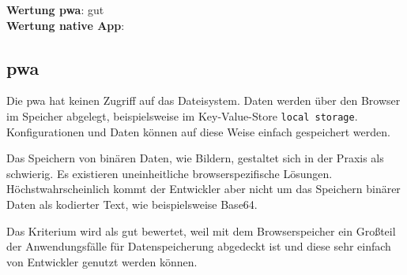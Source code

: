 \textbf{Wertung \ac{pwa}}: gut\\
\textbf{Wertung native App}:  \\

\subsection{\ac{pwa}}
Die \ac{pwa} hat keinen Zugriff auf das Dateisystem. Daten werden über den Browser im Speicher abgelegt, beispielsweise im Key-Value-Store \texttt{local storage}. Konfigurationen und Daten können auf diese Weise einfach gespeichert werden.

Das Speichern von binären Daten, wie Bildern, gestaltet sich in der Praxis als schwierig. Es existieren uneinheitliche browserspezifische Lösungen. Höchstwahrscheinlich kommt der Entwickler aber nicht um das Speichern binärer Daten als kodierter Text, wie beispielsweise Base64.

Das Kriterium wird als gut bewertet, weil mit dem Browserspeicher ein Großteil der Anwendungsfälle für Datenspeicherung abgedeckt ist und diese sehr einfach von Entwickler genutzt werden können.